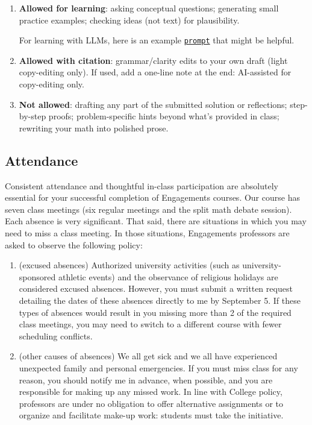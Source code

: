 \documentclass[oneside,11pt]{amsart}
\begin{document}
\begin{enumerate}[$\bullet$]
  \item \textbf{Allowed for learning}: asking conceptual questions; generating small practice examples; checking ideas (not text) for plausibility.

\noindent
For learning with LLMs, here is an example \href{https://gist.githubusercontent.com/lenis2000/cb5ea004f8aa6461be71398e19ae488e/raw/a0103eab0b865a1cedf2f3bf3c00d217bd294005/AI_hint_prompt.txt}{\texttt{prompt}} that might be helpful.
  \item \textbf{Allowed with citation}: grammar/clarity edits to your own draft (light copy-editing only). If used, add a one-line note at the end: AI-assisted for copy-editing only.

  \item \textbf{Not allowed}: drafting any part of the submitted solution or reflections; step-by-step proofs; problem-specific hints beyond what's provided in class; rewriting your math into polished prose.
\end{enumerate}



\subsection{Attendance}

Consistent attendance and thoughtful in-class participation are absolutely essential for your successful completion of Engagements courses. Our course has seven class meetings (six regular meetings and the split math debate session).
Each absence is very significant. That said, there are situations in which you may need to miss a class meeting. In those situations,
Engagements professors are asked to observe the following policy:

\begin{enumerate}[$\bullet$]
    \item (excused absences) Authorized university activities (such as university-sponsored athletic events) and the observance of religious holidays are considered excused absences. However, you must submit a written request detailing the dates of these absences directly to me by September 5. If these types of absences would result in you missing more than 2 of the required class meetings, you may need to switch to a different course with fewer scheduling conflicts.
    \item (other causes of absences)
		We all get sick and we all have experienced unexpected family and personal emergencies. If you must miss class for any reason, you should notify me in advance, when possible, and you are responsible for making up any missed work. In line with College policy, professors are under no obligation to offer alternative assignments or to organize and facilitate make-up work: students must take the initiative.
\end{enumerate}
\end{document}
